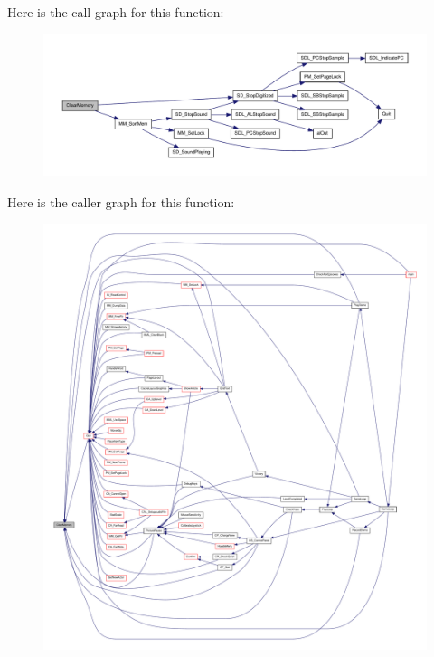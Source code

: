 Here is the call graph for this function:
\nopagebreak
\begin{figure}[H]
\begin{center}
\leavevmode
\includegraphics[width=400pt]{WL__GAME_8C_aef10ed8266c6a98e92c5d6543e7035d6_cgraph}
\end{center}
\end{figure}




Here is the caller graph for this function:
\nopagebreak
\begin{figure}[H]
\begin{center}
\leavevmode
\includegraphics[width=400pt]{WL__GAME_8C_aef10ed8266c6a98e92c5d6543e7035d6_icgraph}
\end{center}
\end{figure}


